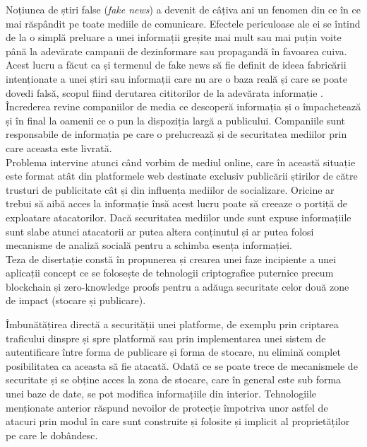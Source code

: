 \hfill

Noțiunea de știri false (\textit{fake news}) a devenit de câțiva ani un fenomen din ce în ce mai răspândit pe toate mediile de comunicare. Efectele periculoase ale ei se întind de la o simplă preluare a unei informații greșite mai mult sau mai puțin voite până la adevărate campanii de dezinformare sau propagandă în favoarea cuiva.\\

Acest lucru a făcut ca și termenul de fake news să fie definit de ideea fabricării intenționate a unei știri sau informații care nu are o baza reală și care se poate dovedi falsă, scopul fiind derutarea cititorilor de la adevărata informație \cite{FakeNews_Def}.\\

Încrederea revine companiilor de media ce descoperă informația și o împachetează și în final la oamenii ce o pun la dispoziția largă a publicului. Companiile sunt responsabile de informația pe care o prelucrează și de securitatea mediilor prin care aceasta este livrată.\\

Problema intervine atunci când vorbim de mediul online, care în această situație este format atât din platformele web destinate exclusiv publicării știrilor de către trusturi de publicitate cât și din influența mediilor de socializare. Oricine ar trebui să aibă acces la informație însă acest lucru poate să creeaze o portiță de exploatare atacatorilor. 
Dacă securitatea mediilor unde sunt expuse informațiile sunt slabe atunci atacatorii ar putea altera conținutul și ar putea folosi mecanisme de analiză socială pentru a schimba esența informației.\\

Teza de disertație constă în propunerea și crearea unei faze incipiente a unei aplicații concept ce se folosește de tehnologii criptografice puternice precum blockchain și zero-knowledge proofs pentru a adăuga securitate celor două zone de impact (stocare și publicare).\\

\clearpage

Îmbunătățirea directă a securității unei platforme, de exemplu prin criptarea traficului dinspre și spre platformă sau prin implementarea unei sistem de autentificare între forma de publicare și forma de stocare, nu elimină complet posibilitatea ca aceasta să fie atacată. Odată ce se poate trece de mecanismele de securitate și se obține acces la zona de stocare, care în general este sub forma unei baze de date, se pot modifica informațiile din interior. Tehnologiile menționate anterior răspund nevoilor de protecție împotriva unor astfel de atacuri prin modul în care sunt construite și folosite și implicit al proprietăților pe care le dobândesc.  \\

